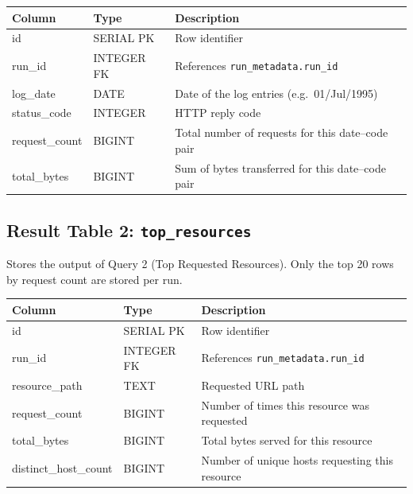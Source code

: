 \documentclass[11pt,a4paper]{article}
\begin{document}
\begin{schematable}
\begin{tabularx}{\linewidth}{@{} >{\ttfamily\small}l >{\small}l X @{}}
\toprule
\textnormal{\textbf{Column}} & \textbf{Type} & \textbf{Description} \\
\midrule
id            & SERIAL PK  & Row identifier \\
run\_id       & INTEGER FK & References \texttt{run\_metadata.run\_id} \\
log\_date     & DATE       & Date of the log entries (e.g.\ 01/Jul/1995) \\
status\_code  & INTEGER    & HTTP reply code \\
request\_count & BIGINT    & Total number of requests for this date--code pair \\
total\_bytes  & BIGINT     & Sum of bytes transferred for this date--code pair \\
\bottomrule
\end{tabularx}
\end{schematable}

\subsection{Result Table 2: \texttt{top\_resources}}

Stores the output of Query 2 (Top Requested Resources). Only the top 20 rows by request count are stored per run.

\begin{schematable}
\begin{tabularx}{\linewidth}{@{} >{\ttfamily\small}l >{\small}l X @{}}
\toprule
\textnormal{\textbf{Column}} & \textbf{Type} & \textbf{Description} \\
\midrule
id                 & SERIAL PK  & Row identifier \\
run\_id            & INTEGER FK & References \texttt{run\_metadata.run\_id} \\
resource\_path     & TEXT       & Requested URL path \\
request\_count     & BIGINT     & Number of times this resource was requested \\
total\_bytes       & BIGINT     & Total bytes served for this resource \\
distinct\_host\_count & BIGINT  & Number of unique hosts requesting this resource \\
\bottomrule
\end{tabularx}
\end{schematable}
\end{document}
